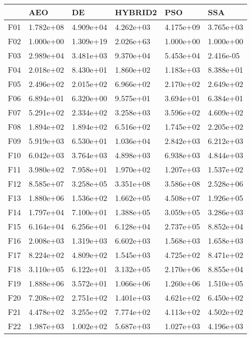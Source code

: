 \begin{tabular}{llllll}
\toprule
{} &        AEO &         DE &    HYBRID2 &        PSO &        SSA \\
\midrule
F01  &  1.782e+08 &  4.909e+04 &  4.262e+03 &  4.175e+09 &  3.765e+03 \\
F02  &  1.000e+00 &  1.309e+19 &  2.026e+63 &  1.000e+00 &  1.000e+00 \\
F03  &  2.989e+04 &  3.481e+03 &  9.370e+04 &  5.453e+04 &  2.416e-05 \\
F04  &  2.018e+02 &  8.430e+01 &  1.860e+02 &  1.183e+03 &  8.388e+01 \\
F05  &  2.496e+02 &  2.015e+02 &  6.966e+02 &  2.170e+02 &  2.649e+02 \\
F06  &  6.894e+01 &  6.320e+00 &  9.575e+01 &  3.694e+01 &  6.384e+01 \\
F07  &  5.291e+02 &  2.334e+02 &  3.258e+03 &  3.596e+02 &  4.609e+02 \\
F08  &  1.894e+02 &  1.894e+02 &  6.516e+02 &  1.745e+02 &  2.205e+02 \\
F09  &  5.919e+03 &  6.530e+01 &  1.036e+04 &  2.842e+03 &  6.212e+03 \\
F10  &  6.042e+03 &  3.764e+03 &  4.898e+03 &  6.938e+03 &  4.844e+03 \\
F11  &  3.980e+02 &  7.958e+01 &  1.970e+02 &  1.207e+03 &  1.537e+02 \\
F12  &  8.585e+07 &  3.258e+05 &  3.351e+08 &  3.586e+08 &  2.528e+06 \\
F13  &  1.880e+06 &  1.536e+02 &  1.662e+05 &  4.508e+07 &  1.926e+05 \\
F14  &  1.797e+04 &  7.100e+01 &  1.388e+05 &  3.059e+05 &  3.286e+03 \\
F15  &  6.164e+04 &  6.256e+01 &  6.128e+04 &  2.737e+05 &  8.852e+04 \\
F16  &  2.008e+03 &  1.319e+03 &  6.602e+03 &  1.568e+03 &  1.658e+03 \\
F17  &  8.224e+02 &  4.809e+02 &  1.545e+03 &  4.725e+02 &  8.471e+02 \\
F18  &  3.110e+05 &  6.122e+01 &  3.132e+05 &  2.170e+06 &  8.855e+04 \\
F19  &  1.888e+06 &  3.572e+01 &  1.066e+06 &  1.260e+06 &  1.510e+05 \\
F20  &  7.208e+02 &  2.751e+02 &  1.401e+03 &  4.621e+02 &  6.450e+02 \\
F21  &  4.478e+02 &  3.255e+02 &  7.774e+02 &  4.113e+02 &  4.502e+02 \\
F22  &  1.987e+03 &  1.002e+02 &  5.687e+03 &  1.027e+03 &  4.196e+03 \\

\end{tabular}
